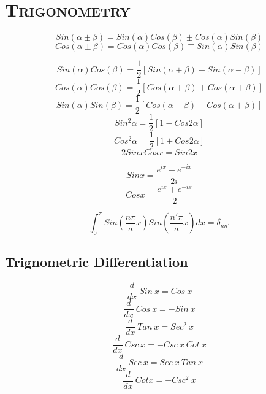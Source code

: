 \documentclass[fleqn, 14pt]{extarticle} %
\begin{document}
\section{\textsc{Trigonometry}}
\large
\begin{equation}
	Sin(\alpha\pm\beta) = Sin (\alpha) Cos (\beta)\pm Cos (\alpha) Sin (\beta)
\end{equation}
\begin{equation}
	Cos(\alpha\pm\beta)= Cos (\alpha)Cos(\beta)\mp Sin(\alpha) Sin(\beta)
\end{equation}

\begin{equation}
Sin(\alpha)Cos(\beta)=\frac{1}{2}[Sin(\alpha+\beta)+Sin(\alpha-\beta)]
\end{equation}
\begin{equation}
	Cos(\alpha)Cos(\beta)=\frac{1}{2}[Cos(\alpha+\beta)+Cos(\alpha+\beta)]
\end{equation}
\begin{equation}
Sin(\alpha)Sin(\beta)=\frac{1}{2}[Cos(\alpha-\beta)-Cos(\alpha+\beta)]
\end{equation}
\begin{equation}
Sin^2\alpha=\frac{1}{2}[1-Cos2\alpha]
\end{equation}
\begin{equation}
Cos^2\alpha=\frac{1}{2}[1+Cos2\alpha]
\end{equation}
\begin{equation}
	2 Sin x Cos x = Sin 2x
\end{equation}

\begin{equation}
  Sin x=\frac{e^{ix}-e^{-ix}}{2i}
\end{equation}
\begin{equation}
Cos x=\frac{e^{ix}+e^{-ix}}{2}
\end{equation}

\begin{equation}
\int_{0}^{\pi} Sin(\frac{n\pi}{a}x)Sin(\frac{n'\pi}{a}x) dx =\delta_{n n'}
\end{equation}
\newpage
\subsection{Trignometric Differentiation}
\begin{equation}
	\frac{d}{dx} \ Sin\ x= Cos\ x
\end{equation}
\begin{equation}
	\frac{d}{dx} \ Cos \ x= - Sin\ x
\end{equation}
\begin{equation}
	\frac{d}{dx} \ Tan \ x= Sec^2\ x
\end{equation}
\begin{equation}
	\frac{d}{dx} \ Csc \ x= -Csc\ x \ Cot\ x
\end{equation}
\begin{equation}
	\frac{d}{dx} \ Sec \ x= Sec\ x\ Tan \ x
\end{equation}
\begin{equation}
	\frac{d}{dx} \ Cot x= -Csc^2\ x
\end{equation}\label{dtri}
\end{document}
